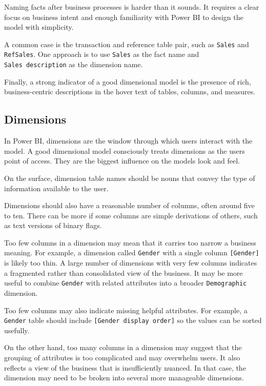 \documentclass[10pt,openany,10pt]{book}
\begin{document}
Naming facts after business processes is harder than it sounds. It
requires a clear focus on business intent and enough familiarity with
Power BI to design the model with simplicity.

A common case is the transaction and reference table pair, such as
\texttt{Sales} and \texttt{RefSales}. One approach is to use
\texttt{Sales} as the fact name and \texttt{Sales\ description} as the
dimension name.

Finally, a strong indicator of a good dimensional model is the presence
of rich, business-centric descriptions in the hover text of tables,
columns, and measures.

\subsection{Dimensions}\label{dimensions}

In Power BI, dimensions are the window through which users interact with
the model. A good dimensional model consciously treats dimensions as the
user\textquotesingle s point of access. They are the biggest influence
on the model\textquotesingle s look and feel.

On the surface, dimension table names should be nouns that convey the
type of information available to the user.

Dimensions should also have a reasonable number of columns, often around
five to ten. There can be more if some columns are simple derivations of
others, such as text versions of binary flags.

Too few columns in a dimension may mean that it carries too narrow a
business meaning. For example, a dimension called \texttt{Gender} with a
single column \texttt{{[}Gender{]}} is likely too thin. A large number
of dimensions with very few columns indicates a fragmented rather than
consolidated view of the business. It may be more useful to combine
\texttt{Gender} with related attributes into a broader
\texttt{Demographic} dimension.

Too few columns may also indicate missing helpful attributes. For
example, a \texttt{Gender} table should include
\texttt{{[}Gender\ display\ order{]}} so the values can be sorted
usefully.

On the other hand, too many columns in a dimension may suggest that the
grouping of attributes is too complicated and may overwhelm users. It
also reflects a view of the business that is insufficiently nuanced. In
that case, the dimension may need to be broken into several more
manageable dimensions.
\end{document}
